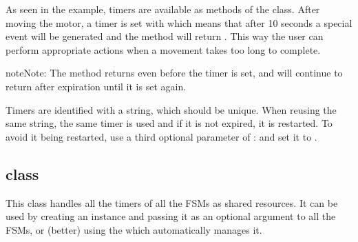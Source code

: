 \documentclass[letterpaper,10pt,english]{sphinxmanual}
\begin{document}
As seen in the example, timers are available as methods of the {\hyperref[\detokenize{fsm:fsmBase}]{}}
class. After moving the motor, a timer is set with {\hyperref[\detokenize{fsm:tmrSet}]{}} which means
that after 10 seconds a special event will be generated and the method
{\hyperref[\detokenize{fsm:tmrExpired}]{}} will return . This way the user can perform
appropriate actions when a movement takes too long to complete.

\begin{sphinxadmonition}{note}{Note:}
The {\hyperref[\detokenize{fsm:tmrExpired}]{}} method returns  even before the timer is set, and will continue to return  after expiration until it is set again.
\end{sphinxadmonition}

Timers are identified with a string, which should be unique. When reusing the
same string, the same timer is used and if it is not expired, it is restarted.
To avoid it being restarted, use a third optional parameter of {\hyperref[\detokenize{fsm:tmrSet}]{}}:
 and set it to .


\subsection{ class}
\label{\detokenize{timer:fsmtimers-class}}

\begin{fulllineitems}
\label{\detokenize{timer:fsmTimers}}
This class handles all the timers of all the FSMs as shared resources. It
can be used by creating an instance and passing it as an optional argument
to all the FSMs, or (better) using the {\hyperref[\detokenize{loader:module-loader}]{}} which automatically
manages it.

\end{fulllineitems}
\end{document}
